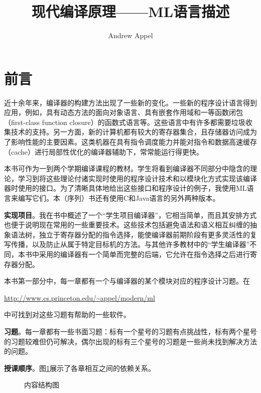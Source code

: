 \documentclass[cn,11pt,chinese]{elegantbook}
\title{现代编译原理——ML语言描述}
\author{Andrew Appel}
\begin{document}
\maketitle
\frontmatter

\tableofcontents

\mainmatter

\chapter*{前言}

近十余年来，编译器的构建方法出现了一些新的变化。一些新的程序设计语言得到应用，例如，具有动态方法的面向对象语言、具有嵌套作用域和一等函数闭包（first-class function closure）的函数式语言等。这些语言中有许多都需要垃圾收集技术的支持。另一方面，新的计算机都有较大的寄存器集合，且存储器访问成为了影响性能的主要因素。这类机器在具有指令调度能力并能对指令和数据高速缓存（cache）进行局部性优化的编译器辅助下，常常能运行得更快。

本书可作为一到两个学期编译课程的教材。学生将看到编译器不同部分中隐含的理论，学习到将这些理论付诸实现时使用的程序设计技术和以模块化方式实现该编译器时使用的接口。为了清晰具体地给出这些接口和程序设计的例子，我使用ML语言来编写它们。本（序列）书还有使用C和Java语言的另外两种版本。

\textbf{实现项目}。我在书中概述了一个“学生项目编译器”，它相当简单，而且其安排方式也便于说明现在常用的一些重要技术。这些技术包括避免语法和语义相互纠缠的抽象语法树，独立于寄存器分配的指令选择，能使编译器前期阶段有更多灵活性的复写传播，以及防止从属于特定目标机的方法。与其他许多教材中的“学生编译器”不同，本书中采用的编译器有一个简单而完整的后端，它允许在指令选择之后进行寄存器分配。

本书第一部分中，每一章都有一个与编译器的某个模块对应的程序设计习题。在

\href{http://www.cs.princeton.edu/\textasciitilde appel/modern/ml}{http://www.cs.princeton.edu/\textasciitilde appel/modern/ml}

中可找到对这些习题有帮助的一些软件。

\textbf{习题}。每一章都有一些书面习题：标有一个星号的习题有点挑战性，标有两个星号的习题较难但仍可解决，偶尔出现的标有三个星号的习题是一些尚未找到解决方法的问题。

\textbf{授课顺序}。图\ref{fig:0-1}展示了各章相互之间的依赖关系。

\begin{figure}[htbp]
	\centering
  
  \caption{内容结构图}
  \label{fig:0-1}
\end{figure}
\end{document}
